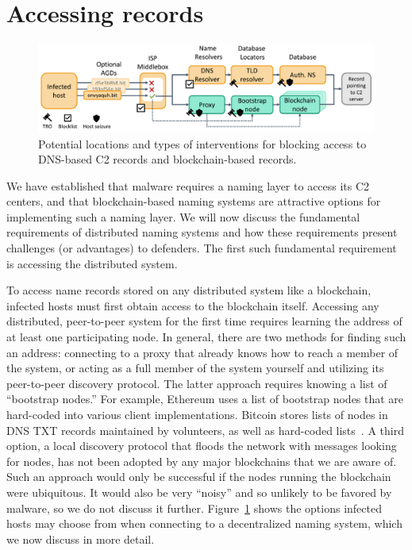 \section{Accessing records}
\label{sec:accessing_records}

\begin{figure}[t]
	\centering
	\includegraphics[width=\textwidth]{figs/intervention_locations.pdf}
	\caption{Potential locations and types of interventions for blocking access 
		to 	DNS-based C2 records and blockchain-based records.}
	\label{fig:malware_contacting_cnc}
\end{figure}

We have established that malware requires a naming layer to access its C2 
centers, and 
that blockchain-based naming systems are attractive options for implementing 
such a naming layer. 
We will now discuss the fundamental requirements of distributed naming systems 
and how 
these requirements present challenges (or advantages) to defenders. The first 
such fundamental 
requirement is accessing the distributed system.

To access name records stored on any distributed system like a blockchain, 
infected hosts must 
first obtain access to the blockchain itself. Accessing any distributed, 
peer-to-peer system for 
the first time requires learning the address of at least one participating 
node. In general, there 
are two methods for finding such an address: connecting to a 
proxy that already knows how to reach a member of the system, or acting 
as a full member of the system yourself and utilizing its peer-to-peer 
discovery protocol. The 
latter approach requires knowing a list of ``bootstrap nodes.'' For example, 
Ethereum uses a list 
of bootstrap nodes that are hard-coded into various client 
implementations. Bitcoin 
stores lists of nodes in DNS TXT records maintained by volunteers, as well 
as hard-coded 
lists~\cite{citation_needed}. A third option, a 
local discovery protocol that floods the network with 
messages looking for nodes, has not been adopted by any major 
blockchains that we are aware of. Such an approach would only be successful if 
the nodes running 
the blockchain were ubiquitous. It would also be very ``noisy'' and so 
unlikely to be favored by 
malware, so we do not discuss it further. 
Figure~\ref{fig:malware_contacting_cnc} shows the options 
infected hosts may choose from when connecting to a decentralized naming 
system, which we now 
discuss in more detail.

